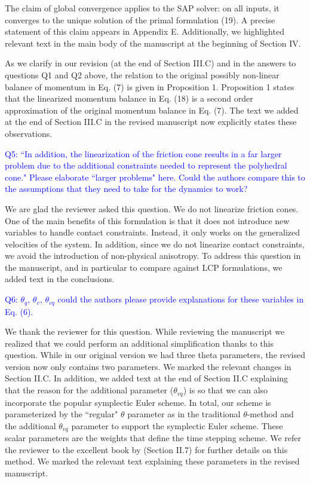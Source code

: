 The claim of global convergence applies to the SAP solver: on all inputs, it
converges to the unique solution of the primal formulation (19). A precise
statement of this claim appears in Appendix E. Additionally, we highlighted
relevant text in the main body of the manuscript at the beginning of Section IV.

As we clarify in our revision (at the end of Section III.C) and in the answers
to questions Q1 and Q2 above, the relation to the original possibly non-linear
balance of momentum in Eq. (7) is given in Proposition 1. Proposition 1 states
that the linearized momentum balance in Eq. (18) is a second order approximation
of the original momentum balance in Eq. (7). The text we added at the end of
Section III.C in the revised manuscript now explicitly states these
observations.
\vspace{5mm}

\textcolor{blue}{Q5: ``In addition, the linearization of the friction cone
results in a far larger problem due to the additional constraints needed to
represent the polyhedral cone." Please elaborate ``larger problems" here. Could
the authors compare this to the assumptions that they need to take for the
dynamics to work?}

We are glad the reviewer asked this question. We do not linearize friction
cones. One of the main benefits of this formulation is that it does not
introduce new variables to handle contact constraints. Instead, it only works on
the generalized velocities of the system. In addition, since we do not linearize
contact constraints, we avoid the introduction of non-physical anisotropy. To
address this question in the manuscript, and in particular to compare against
LCP formulations, we added text in the conclusions.
\vspace{5mm}

\textcolor{blue}{Q6: $\theta_q$, $\theta_v$, $\theta_{vq}$ could the authors
please provide explanations for these variables in Eq. (6).}

We thank the reviewer for this question. While reviewing the manuscript we
realized that we could perform an additional simplification thanks to this
question. While in our original version we had three theta parameters, the
revised version now only contains two parameters. We marked the relevant changes
in Section II.C. In addition, we added text at the end of Section II.C
explaining that the reason for the additional parameter ($\theta_{vq}$) is so
that we can also incorporate the popular symplectic Euler scheme. In total, our
scheme is parameterized by the ``regular" $\theta$ parameter as in the
traditional $\theta$-method and the additional $\theta_{vq}$ parameter to
support the symplectic Euler scheme. These scalar parameters are the weights
that define the time stepping scheme. We refer the reviewer to the excellent
book by
\cite{bib:hairer2008solving}
(Section II.7) for further details on this method. We marked the relevant text
explaining these parameters in the revised manuscript.
\vspace{5mm}


